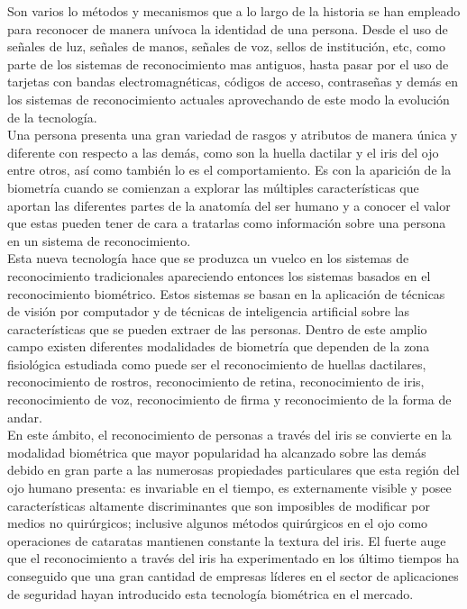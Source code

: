 Son varios lo métodos y mecanismos que a lo largo de la historia se han empleado para reconocer de manera unívoca la identidad de una persona. Desde el uso de señales de luz, señales de manos, señales de voz, sellos de institución, etc, como parte de los sistemas de reconocimiento mas antiguos, hasta pasar por el uso de tarjetas con bandas electromagnéticas, códigos de acceso, contraseñas y demás en los sistemas de reconocimiento actuales aprovechando de este modo la evolución de la tecnología.\\

Una persona presenta una gran variedad de rasgos y atributos de manera única y diferente con respecto a las demás, como son la huella dactilar y el iris del ojo entre otros, así como también lo es el comportamiento. Es con la aparición de la biometría cuando se comienzan a explorar las múltiples características que aportan las diferentes partes de la anatomía del ser humano y a conocer el valor que estas pueden tener de cara a tratarlas como información sobre una persona en un sistema de reconocimiento.  \\

Esta nueva tecnología hace que se produzca un vuelco en los sistemas de reconocimiento tradicionales apareciendo entonces los sistemas basados en el reconocimiento biométrico. Estos sistemas se basan en la aplicación de técnicas de visión por computador y de técnicas de inteligencia artificial sobre las características que se pueden extraer de las personas. Dentro de este amplio campo existen diferentes modalidades de biometría que dependen de la zona fisiológica estudiada como puede ser el reconocimiento de huellas dactilares, reconocimiento de rostros, reconocimiento de retina, reconocimiento de iris, reconocimiento de voz, reconocimiento de firma y reconocimiento de la forma de andar.  \\

En este ámbito, el reconocimiento de personas a través del iris se convierte en la modalidad biométrica que mayor popularidad ha alcanzado sobre las demás debido en gran parte a las numerosas propiedades particulares que esta región del ojo humano presenta: es invariable en el tiempo, es externamente visible y posee características altamente discriminantes que son imposibles de modificar por medios no quirúrgicos; inclusive algunos métodos quirúrgicos en el ojo como operaciones de cataratas mantienen constante la textura del iris. El fuerte auge que el reconocimiento a través del iris ha experimentado en los último tiempos ha conseguido que una gran cantidad de empresas líderes en el sector de aplicaciones de seguridad hayan introducido esta tecnología biométrica en el mercado.\\

